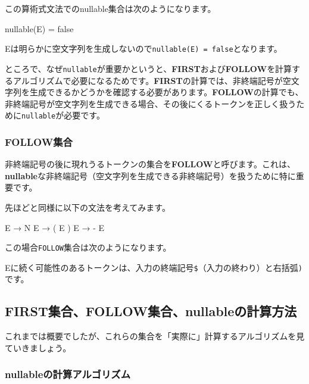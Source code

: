 この算術式文法でのnullable集合は次のようになります。

\begin{codescreen}{}
nullable(E) = false
\end{codescreen}

Eは明らかに空文字列を生成しないので\texttt{nullable(E)\ =\ false}となります。

ところで、なぜ\texttt{nullable}が重要かというと、\textbf{\sffamily FIRST}および\textbf{\sffamily FOLLOW}を計算するアルゴリズムで必要になるためです。\textbf{\sffamily FIRST}の計算では、非終端記号が空文字列を生成できるかどうかを確認する必要があります。\textbf{\sffamily FOLLOW}の計算でも、非終端記号が空文字列を生成できる場合、その後にくるトークンを正しく扱うために\texttt{nullable}が必要です。

\subsubsection{FOLLOW集合}

非終端記号の後に現れうるトークンの集合を\textbf{\sffamily FOLLOW}と呼びます。これは、\textbf{\sffamily nullable}な非終端記号（空文字列を生成できる非終端記号）を扱うために特に重要です。

先ほどと同様に以下の文法を考えてみます。

\begin{codescreen}{}
E  → N
E  → ( E )
E  → - E
\end{codescreen}

この場合\texttt{FOLLOW}集合は次のようになります。


Eに続く可能性のあるトークンは、入力の終端記号\texttt{\$}（入力の終わり）と右括弧\texttt{)}です。

\subsection{FIRST集合、FOLLOW集合、nullableの計算方法}

これまでは概要でしたが、これらの集合を「実際に」計算するアルゴリズムを見ていきましょう。

\subsubsection{nullableの計算アルゴリズム}

